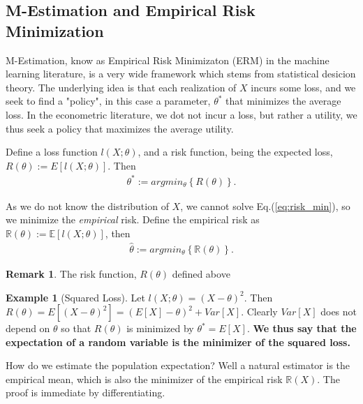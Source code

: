 \documentclass[12pt,a4paper]{article}
\theoremstyle{plain}
\theoremstyle{definition}
\newtheorem{remark}{Remark}
\newtheorem{example}{Example}
\newcommand{\expect}[1]{E\left[ #1 \right]}
\newcommand{\expectn}[1]{\mathbb{E}\left[#1\right]}
\newcommand{\loss}{l}
\newcommand{\risk}{R}
\newcommand{\riskn}{\mathbb{R}}
\newcommand{\argmin}[2]{argmin_{#1}\left\{ #2 \right\}}
\begin{document}
\subsection{M-Estimation and Empirical Risk Minimization}
\label{sec:m_estimation}

M-Estimation, know as Empirical Risk Minimizaton (ERM) in the machine learning literature, is a very wide framework which stems from statistical desicion theory.
The underlying idea is that each realization of $X$ incurs some loss, and we seek to find a "policy", in this case a parameter, $\theta^*$ that minimizes the average loss.
In the econometric literature, we dot not incur a loss, but rather a utility, we thus seek a policy that maximizes the average utility.

Define a loss function $\loss(X;\theta)$, and a risk function, being the expected loss, 
$\risk(\theta):=\expect{\loss(X;\theta)}$. Then 
\begin{align}
\label{eq:risk_min}
 \theta^*:= \argmin{\theta}{\risk(\theta)}.
\end{align}



As we do not know the distribution of $X$, we cannot solve Eq.(\ref{eq:risk_min}), so we minimize the \emph{empirical} risk. 
Define the empirical risk as $\riskn(\theta):=\expectn{\loss(X;\theta)}$, then 
\begin{align}
\label{eq:empirical_risk_min}
 \hat{\theta}:= \argmin{\theta}{\riskn(\theta)}.
\end{align}

\begin{remark}
The risk function, $\risk(\theta)$ defined above
\end{remark}



\begin{example}[Squared Loss]
Let $\loss(X;\theta)=(X-\theta)^2$. Then 
$
	\risk(\theta) = 
	\expect{(X-\theta)^2} = 
	(\expect{X}-\theta)^2 + Var[X]. 
$
Clearly  $Var[X]$ does not depend on $\theta$  so that $\risk(\theta)$ is minimized by $\theta^*=\expect{X}$.
\textbf{We thus say that the expectation of a random variable is the minimizer of the squared loss.}

How do we estimate the population expectation? Well a natural estimator is the empirical mean, which is also the minimizer of the empirical risk $\riskn(X)$. The proof is immediate by differentiating. 
\end{example}
\end{document}

